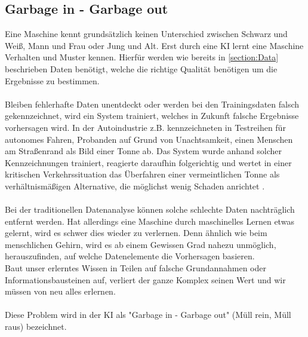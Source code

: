 \documentclass[12pt,oneside,a4paper,parskip]{scrbook}
\begin{document}
\subsection{Garbage in - Garbage out}
\label{section:DataGarbage}
Eine Maschine kennt grundsätzlich keinen Unterschied zwischen Schwarz und Weiß, Mann und Frau oder Jung und Alt. Erst durch eine KI lernt eine Maschine Verhalten und Muster kennen. Hierfür werden wie bereits in \ref{section:Data} beschrieben Daten benötigt, welche die richtige Qualität benötigen um die Ergebnisse zu bestimmen.
\\\\
Bleiben fehlerhafte Daten unentdeckt oder werden bei den Trainingsdaten falsch gekennzeichnet, wird ein System trainiert, welches in Zukunft falsche Ergebnisse vorhersagen wird. In der Autoindustrie z.B. kennzeichneten in Testreihen für autonomes Fahren, Probanden auf Grund von Unachtsamkeit, einen Menschen am Straßenrand als Bild einer Tonne ab. Das System wurde anhand solcher Kennzeichnungen trainiert, reagierte daraufhin folgerichtig und wertet in einer kritischen Verkehrssituation das Überfahren einer vermeintlichen Tonne als verhältnismäßigen Alternative, die möglichst wenig Schaden anrichtet \cite{trainingsDataKI}.
\\\\
Bei der traditionellen  Datenanalyse können solche schlechte Daten nachträglich entfernt werden. Hat allerdings eine Maschine durch maschinelles Lernen etwas gelernt, wird es schwer dies wieder zu verlernen. Denn ähnlich wie beim menschlichen Gehirn, wird es ab einem Gewissen Grad nahezu unmöglich, herauszufinden, auf welche Datenelemente die Vorhersagen basieren.\\
Baut unser erlerntes Wissen in Teilen auf falsche Grundannahmen oder Informationsbausteinen auf, verliert der ganze Komplex seinen Wert und wir müssen von neu alles erlernen.
\\\\
Diese Problem wird in der KI als "Garbage in - Garbage out" (Müll rein, Müll raus) bezeichnet.
\end{document}
